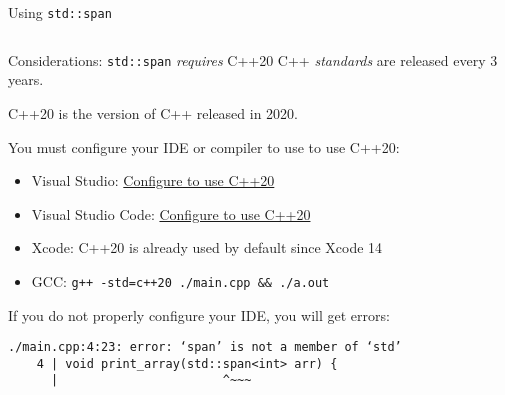 \documentclass[t]{beamer}
\begin{document}
\begin{frame}[fragile]{Using \texttt{std::span}}
	\inputminted{cpp}{./code/with_span.cpp}
\end{frame}


\begin{frame}[fragile]{Considerations: \texttt{std::span} \textit{requires} C++20}
	C++ \textit{standards} are released every 3 years. \newline

	C++20 is the version of C++ released in 2020. \newline

	You must configure your IDE or compiler to use to use C++20:
	\smallskip
	\begin{itemize}
		\item Visual Studio: \hyperlink{https://youtu.be/XsDR01GMxEI?t=144}{Configure to use C++20}
		\item Visual Studio Code: \hyperlink{https://stackoverflow.com/a/68401689}{Configure to use C++20}
		\item Xcode: C++20 is already used by default since Xcode 14
		\item GCC: \texttt{g++ -std=c++20 ./main.cpp \&\& ./a.out}
	\end{itemize}

	\bigskip
	If you do not properly configure your IDE, you will get errors:
	\begin{verbatim}
./main.cpp:4:23: error: ‘span’ is not a member of ‘std’
    4 | void print_array(std::span<int> arr) {
      |                       ^~~~
	\end{verbatim}
\end{frame}
\end{document}

